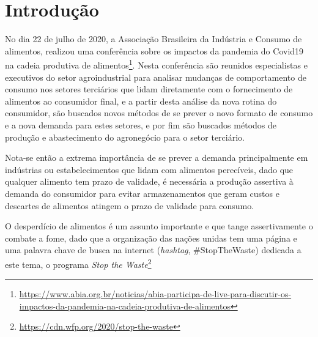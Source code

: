 \chapter{Introdução}


\noindent
{}


No dia 22 de julho de 2020, a Associação Brasileira da Indústria e Consumo de alimentos, realizou uma conferência sobre os impactos da pandemia do Covid19 na cadeia produtiva de alimentos\footnote{\url{https://www.abia.org.br/noticias/abia-participa-de-live-para-discutir-os-impactos-da-pandemia-na-cadeia-produtiva-de-alimentos}}. Nesta conferência são reunidos especialistas e executivos do setor agroindustrial para analisar mudanças de comportamento de consumo nos setores terciários que lidam diretamente com o fornecimento de alimentos ao consumidor final, e a partir desta análise da nova rotina do consumidor, são buscados novos métodos de se prever o novo formato de consumo e a nova demanda para estes setores, e por fim são buscados métodos de produção e abastecimento do agronegócio para o setor terciário.

Nota-se então a extrema importância de se prever a demanda principalmente em indústrias ou estabelecimentos que lidam com alimentos perecíveis, dado que qualquer alimento tem prazo de validade, é necessária a produção assertiva à demanda do consumidor para evitar armazenamentos que geram custos e descartes de alimentos atingem o prazo de validade para consumo.



O desperdício de alimentos é um assunto importante e que tange assertivamente o combate a fome, dado que a organização das nações unidas tem uma página e uma palavra chave de busca na internet (\textit{hashtag}, \#StopTheWaste) dedicada a este tema, o programa \textit{Stop the Waste}\footnote{\url{https://cdn.wfp.org/2020/stop-the-waste}}

